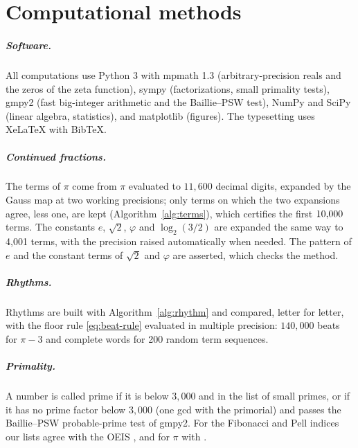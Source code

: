 \chapter{Computational methods}\label{app:methods}

\paragraph{Software.} All computations use Python 3 with mpmath 1.3 (arbitrary-precision reals and the zeros of the zeta function), sympy (factorizations, small primality tests), gmpy2 (fast big-integer arithmetic and the Baillie--PSW test), NumPy and SciPy (linear algebra, statistics), and matplotlib (figures). The typesetting uses XeLaTeX with BibTeX.

\paragraph{Continued fractions.} The terms of $\pi$ come from $\pi$ evaluated to $11{,}600$ decimal digits, expanded by the Gauss map at two working precisions; only terms on which the two expansions agree, less one, are kept (Algorithm~\ref{alg:terms}), which certifies the first $10{,}000$ terms. The constants $e$, $\sqrt 2$, $\varphi$ and $\log_2(3/2)$ are expanded the same way to 4{,}001 terms, with the precision raised automatically when needed. The pattern of $e$ and the constant terms of $\sqrt2$ and $\varphi$ are asserted, which checks the method.

\paragraph{Rhythms.} Rhythms are built with Algorithm~\ref{alg:rhythm} and compared, letter for letter, with the floor rule \eqref{eq:beat-rule} evaluated in multiple precision: $140{,}000$ beats for $\pi - 3$ and complete words for 200 random term sequences.

\paragraph{Primality.} A number is called prime if it is below $3{,}000$ and in the list of small primes, or if it has no prime factor below $3{,}000$ (one gcd with the primorial) and passes the Baillie--PSW probable-prime test of gmpy2. For the Fibonacci and Pell indices our lists agree with the OEIS \citep{OEIS_A001605,OEIS_A096650}, and for $\pi$ with \citep{OEIS_A086788,OEIS_A086785}.

